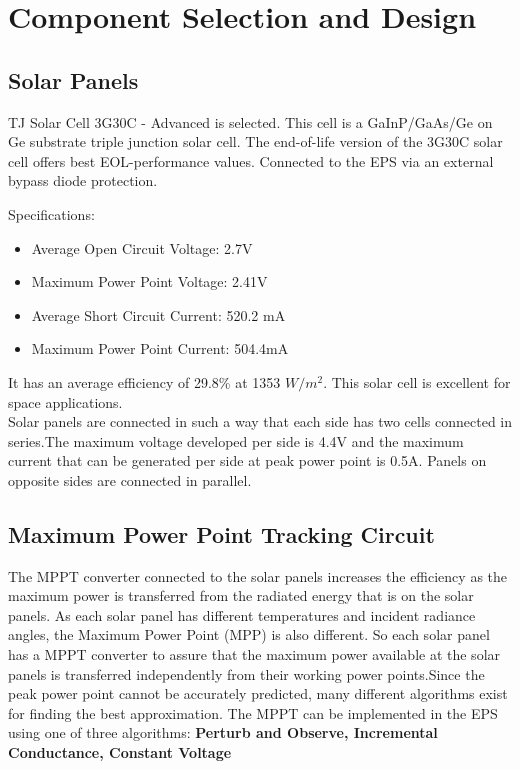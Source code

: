\chapter{Component Selection and Design}
\justifying
\section[Solar Panels]{Solar Panels}
 TJ Solar Cell 3G30C - Advanced is selected. This cell is a GaInP/GaAs/Ge on Ge substrate triple junction solar cell. The end-of-life version of the 3G30C solar cell offers best EOL-performance
 values. Connected to the EPS via an external bypass diode protection.
 
 Specifications:
 \begin{itemize}
 	\item Average Open Circuit Voltage: 2.7V
 	\item Maximum Power Point Voltage: 2.41V
 	\item Average Short Circuit Current: 520.2 mA
 	\item Maximum Power Point Current: 504.4mA
 \end{itemize}
It has an average efficiency of 29.8\% at 1353 $W/m^{2}$. This solar cell is excellent for space applications. 
\\
Solar panels are connected in such a way that each side has two cells connected in series.The maximum voltage developed per side is 4.4V and the maximum current that can be generated per side at peak power point is 0.5A.
Panels on opposite sides are connected in parallel.


\section[MPPT Circuit]{Maximum Power Point Tracking Circuit}
The MPPT converter connected to the solar panels increases the efficiency as the
maximum power is transferred from the radiated energy that is on the solar panels.
As each solar panel has different temperatures and incident radiance angles, the
Maximum Power Point (MPP) is also different. So each solar panel has a MPPT
converter to assure that the maximum power available at the solar panels is
transferred independently from their working power points.Since the peak power
point cannot be accurately predicted, many different algorithms exist for finding
the best approximation. The MPPT can be implemented in the EPS using one of three algorithms:
{\bf Perturb and Observe, Incremental Conductance, Constant Voltage}

